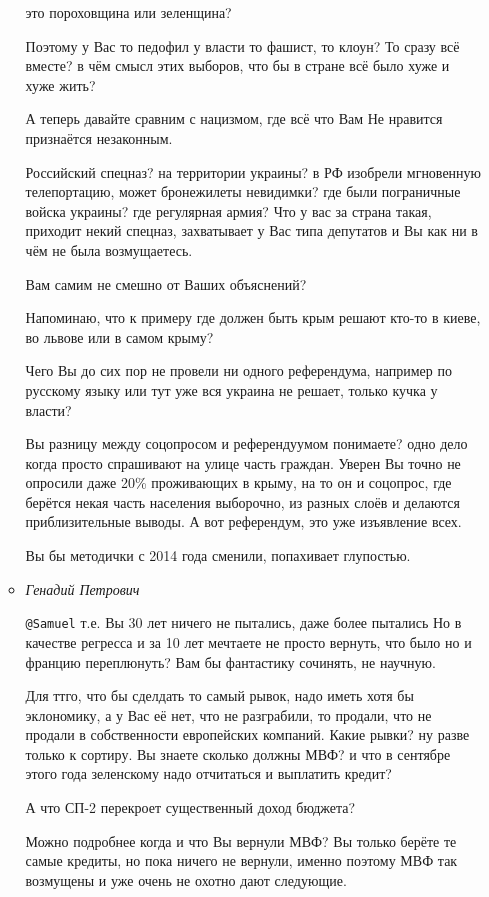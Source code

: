 \begin{itemize}
\begin{itemize}
это пороховщина или зеленщина?

Поэтому у Вас то педофил у власти то фашист, то клоун? То сразу всё вместе? в
чём смысл этих выборов, что бы в стране всё было хуже и хуже жить?

А теперь давайте сравним с нацизмом, где всё что Вам Не нравится признаётся
незаконным.

Российский спецназ? на территории украины? в РФ изобрели мгновенную
телепортацию, может бронежилеты невидимки? где были пограничные войска украины?
где регулярная армия? Что у вас за страна такая, приходит некий спецназ,
захватывает у Вас типа депутатов и Вы как ни в чём не была возмущаетесь.

Вам самим не смешно от Ваших объяснений?

Напоминаю, что к примеру где должен быть крым решают кто-то в киеве, во львове
или в самом крыму?

Чего Вы до сих пор не провели ни одного референдума, например по русскому языку
или тут уже вся украина не решает, только кучка у власти?

Вы разницу между соцопросом и референдуумом понимаете? одно дело когда просто
спрашивают на улице часть граждан. Уверен Вы точно не опросили даже 20\%
проживающих в крыму, на то он и соцопрос, где берётся некая часть населения
выборочно, из разных слоёв и делаются приблизительные выводы. А вот
референдум, это уже изъявление всех.

Вы бы методички с 2014 года сменили, попахивает глупостью.

\item \emph{Генадий Петрович}

\verb|@Samuel|  т.е. Вы 30 лет ничего не пытались, даже более пытались Но в качестве
регресса и за 10 лет мечтаете не просто вернуть, что было но и францию
переплюнуть? Вам бы фантастику сочинять, не научную.

Для ттго, что бы сделдать то самый рывок, надо иметь хотя бы эклономику, а у
Вас её нет, что не разграбили, то продали, что не продали в собственности
европейских компаний. Какие рывки? ну разве только к сортиру. Вы знаете
сколько должны МВФ? и что в сентябре этого года зеленскому надо отчитаться и
выплатить кредит? 

А что СП-2 перекроет существенный доход бюджета?

Можно подробнее когда и что Вы вернули МВФ? Вы только берёте те самые кредиты,
но пока ничего не вернули, именно поэтому МВФ так возмущены и уже очень не
охотно дают следующие.


\end{itemize}
\end{itemize}
